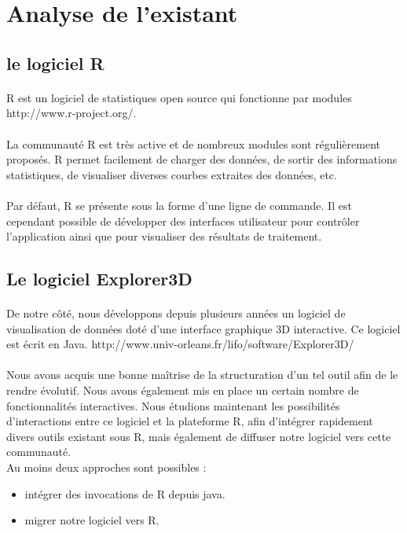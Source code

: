 \section{Analyse de l'existant}
\subsection{le logiciel R}
\paragraph{}
R est un logiciel de statistiques open source qui fonctionne par modules
http://www.r-project.org/.
\paragraph{}
La communauté R est très active et de nombreux modules sont régulièrement proposés.
R permet facilement de charger des données, de sortir des informations statistiques, de visualiser
diverses courbes extraites des données, etc.
\paragraph{}
Par défaut, R se présente sous la forme d'une ligne de commande. Il est cependant possible de
développer des interfaces utilisateur pour contrôler l'application ainsi que pour visualiser des
résultats de traitement.


\subsection{Le logiciel Explorer3D}
\paragraph{}
De notre côté, nous développons depuis plusieurs années un logiciel de visualisation de données
doté d'une interface graphique 3D interactive. Ce logiciel est écrit en Java.
http://www.univ-orleans.fr/lifo/software/Explorer3D/
\paragraph{}
Nous avons acquis une bonne maîtrise de la structuration d'un tel outil afin de le rendre évolutif.
Nous avons également mis en place un certain nombre de fonctionnalités interactives.
Nous étudions maintenant les possibilités d'interactions entre ce logiciel et la plateforme R, afin d'intégrer rapidement divers outils existant sous R, mais également de diffuser notre logiciel vers cette communauté.\\Au moins deux approches sont possibles :
\begin{itemize}

\item intégrer des invocations de R depuis java.
\item migrer notre logiciel vers R.
\end{itemize}

